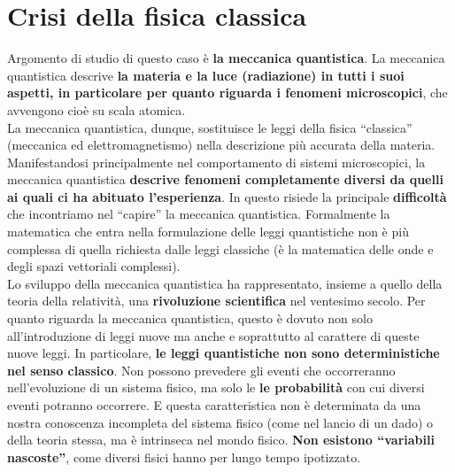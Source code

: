 \pagestyle{VS}
\chapter{Crisi della fisica classica}
Argomento di studio di questo caso è \textbf{la meccanica quantistica}. La meccanica quantistica descrive \textbf{la materia e la luce (radiazione) in tutti i suoi aspetti, in particolare per quanto riguarda i fenomeni microscopici}, che avvengono cioè su scala atomica.\\

La meccanica quantistica, dunque, sostituisce le leggi della fisica ``classica'' (meccanica ed elettromagnetismo) nella descrizione più accurata della materia. Manifestandosi principalmente nel comportamento di sistemi microscopici, la meccanica quantistica \textbf{descrive fenomeni completamente diversi da quelli ai quali ci ha abituato l'esperienza}. In questo risiede la principale \textbf{difficoltà} che incontriamo nel ``capire'' la meccanica quantistica. Formalmente la matematica che entra nella formulazione delle leggi quantistiche non è più complessa di quella richiesta dalle leggi classiche (è la matematica delle onde e degli spazi vettoriali complessi).\\

Lo sviluppo della meccanica quantistica ha rappresentato, insieme a quello della teoria della relatività, una \textbf{rivoluzione scientifica} nel ventesimo secolo. Per quanto riguarda la meccanica quantistica, questo è dovuto non solo all'introduzione di leggi nuove ma anche e soprattutto al carattere di queste nuove leggi. In particolare, \textbf{le leggi quantistiche non sono deterministiche nel senso classico}. Non possono prevedere gli eventi che occorreranno nell'evoluzione di un sistema fisico, ma solo le \textbf{le probabilità} con cui diversi eventi potranno occorrere. E questa caratteristica non è determinata da una nostra conoscenza incompleta del sistema fisico (come nel lancio di un dado) o della teoria stessa, ma è intrinseca nel mondo fisico. \textbf{Non esistono ``variabili nascoste''}, come diversi fisici hanno per lungo tempo ipotizzato.\\

